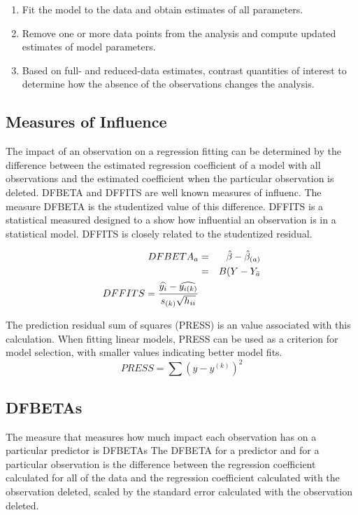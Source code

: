 \documentclass[Main.tex]{subfiles}
\begin{document}
\begin{enumerate}
	\item Fit the model to the data and obtain estimates of all parameters.
	\item Remove one or more data points from the analysis and compute updated estimates of model parameters.
	\item Based on full- and reduced-data estimates, contrast quantities of interest to determine how the absence of the observations changes the analysis.
\end{enumerate}
\subsection{Measures of Influence} 
The impact of an observation on a regression fitting can be determined by the difference between the estimated regression coefficient of a model with all observations and the estimated coefficient when the particular observation is deleted. DFBETA and DFFITS are well known measures of influenc. The measure DFBETA is the studentized value of this difference.	DFFITS is a statistical measured designed to a show how influential an observation is in a statistical model. DFFITS is closely related to the studentized residual.

\begin{eqnarray}
DFBETA_{a} &=& \hat{\beta} - \hat{\beta}_{(a)} \\
&=& B(Y-Y_{\bar{a}}
\\ DFFITS = {\widehat{y_i} -
	\widehat{y_{i(k)}} \over s_{(k)} \sqrt{h_{ii}}} 
\end{eqnarray}

The prediction residual sum of squares (PRESS) is an value associated with this calculation. When fitting linear models, PRESS can be used as a criterion for model selection, with smaller values indicating better model fits.
\begin{displaymath}
PRESS = \sum(y-y^{(k)})^2
\end{displaymath}
%	
%	
\subsection{DFBETAs}
The measure that measures how much impact each observation has on a particular predictor is DFBETAs The DFBETA for a predictor and for a particular observation is the difference between the regression coefficient calculated for all of the data and the regression coefficient calculated with the observation deleted, scaled by the standard error calculated with the observation deleted.
\end{document}
